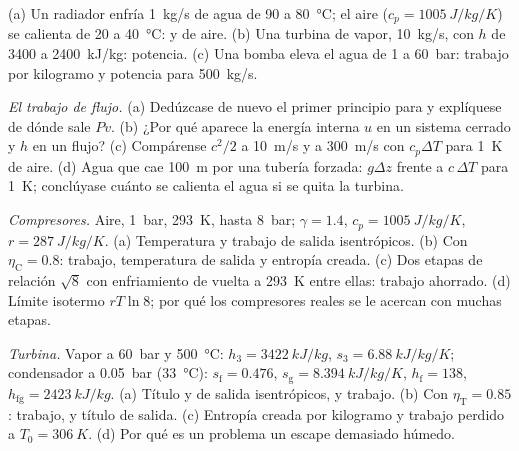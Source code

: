 \begin{exercise}[$\star$]\label{exo:b2:open-systems:4}
(a) Un radiador enfría \qty{1}{kg/s} de agua de \qty{90}{} a \qty{80}{\celsius};
el aire ($c_p = \qty{1005}{J/kg/K}$) se calienta de \qty{20}{} a \qty{40}{\celsius}:
 y  de aire. (b) Una turbina de vapor, \qty{10}{kg/s},
con $h$ de \qty{3400}{} a \qty{2400}{kJ/kg}: potencia. (c) Una bomba eleva el
agua de \qty{1}{} a \qty{60}{bar}: trabajo por kilogramo y potencia para
\qty{500}{kg/s}.
\end{exercise}

\begin{exercise}[$\star\star$]\label{exo:b2:open-systems:5}
\emph{El trabajo de flujo.} (a) Dedúzcase de nuevo el primer principio para  y
explíquese de dónde sale $Pv$. (b) ¿Por qué aparece la energía interna $u$
en un sistema cerrado y $h$ en un flujo? (c) Compárense $c^2/2$ a
\qty{10}{m/s} y a \qty{300}{m/s} con $c_p\Delta T$ para \qty{1}{K} de aire.
(d) Agua que cae \qty{100}{m} por una tubería forzada: $g\Delta z$ frente a
$c\,\Delta T$ para \qty{1}{K}; conclúyase cuánto se calienta el agua si se
quita la turbina.
\end{exercise}

\begin{exercise}[$\star\star$]\label{exo:b2:open-systems:6}
\emph{Compresores.} Aire, \qty{1}{bar}, \qty{293}{K}, hasta \qty{8}{bar}; $\gamma =
1.4$, $c_p = \qty{1005}{J/kg/K}$, $r = \qty{287}{J/kg/K}$. (a) Temperatura y
trabajo de salida isentrópicos. (b) Con $\eta_{\text{C}} = 0.8$: trabajo, temperatura
de salida y entropía creada. (c) Dos etapas de relación $\sqrt8$ con
enfriamiento de vuelta a \qty{293}{K} entre ellas: trabajo ahorrado. (d) Límite
isotermo $rT\ln 8$; por qué los compresores reales se le acercan con muchas etapas.
\end{exercise}

\begin{exercise}[$\star\star$]\label{exo:b2:open-systems:7}
\emph{Turbina.} Vapor a \qty{60}{bar} y \qty{500}{\celsius}: $h_3 = \qty{3422}{kJ/kg}$,
$s_3 = \qty{6.88}{kJ/kg/K}$; condensador a \qty{0.05}{bar} (\qty{33}{\celsius}):
$s_{\text{f}} = 0.476$, $s_{\text{g}} = \qty{8.394}{kJ/kg/K}$, $h_{\text{f}} = 138$,
$h_{\text{fg}} = \qty{2423}{kJ/kg}$. (a) Título y  de salida isentrópicos, y
trabajo. (b) Con $\eta_{\text{T}} = 0.85$: trabajo,  y título
de salida. (c) Entropía creada por kilogramo y trabajo perdido a $T_0 =
\qty{306}{K}$. (d) Por qué es un problema un escape demasiado húmedo.
\end{exercise}

